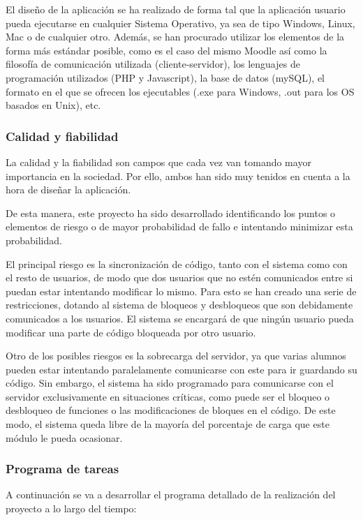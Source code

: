 El diseño de la aplicación se ha realizado de forma tal que la aplicación usuario pueda ejecutarse en cualquier Sistema Operativo, ya sea de tipo Windows, Linux, Mac o de cualquier otro. Además, se han procurado utilizar los elementos de la forma más estándar posible, como es el caso del mismo Moodle así como la filosofía de comunicación utilizada (cliente-servidor), los lenguajes de programación utilizados (PHP y Javascript), la base de datos (mySQL), el formato en el que se ofrecen los ejecutables (.exe para Windows, .out para los OS basados en Unix), etc.

\subsubsection{Calidad y fiabilidad}

La calidad y la fiabilidad son campos que cada vez van tomando mayor importancia en la sociedad. Por ello, ambos han sido muy tenidos en cuenta a la hora de diseñar la aplicación.

De esta manera, este proyecto ha sido desarrollado identificando los puntos o elementos de riesgo o de mayor probabilidad de fallo e intentando minimizar esta probabilidad.

El principal riesgo es la sincronización de código, tanto con el sistema como con el resto de usuarios, de modo que dos usuarios que no estén comunicados entre si puedan estar intentando modificar lo mismo. Para esto se han creado una serie de restricciones, dotando al sistema de bloqueos y desbloqueos que son debidamente comunicados a los usuarios. El sistema se encargará de que ningún usuario pueda modificar una parte de código bloqueada por otro usuario.

Otro de los posibles riesgos es la sobrecarga del servidor, ya que varias alumnos pueden estar intentando paralelamente comunicarse con este para ir guardando su código. Sin embargo, el sistema ha sido programado para comunicarse con el servidor exclusivamente en situaciones críticas, como puede ser el bloqueo o desbloqueo de funciones o las modificaciones de bloques en el código. De este modo, el sistema queda libre de la mayoría del porcentaje de carga que este módulo le pueda ocasionar.

\subsubsection{Programa de tareas}

A continuación se va a desarrollar el programa detallado de la realización del proyecto a lo largo del tiempo:

